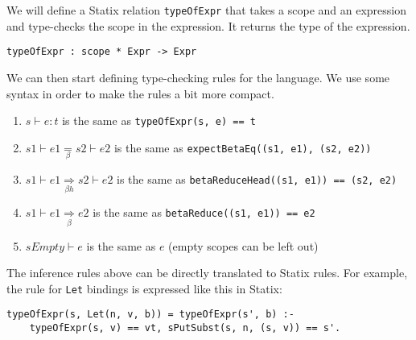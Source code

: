 \documentclass[a4paper,UKenglish,cleveref, autoref, thm-restate]{oasics-v2021}
\newcommand{\bhr}{\underset{\beta h}{\Rightarrow}}
\begin{document}
We will define a Statix relation \verb|typeOfExpr| that takes a scope and an expression and type-checks the scope in the expression. It returns the type of the expression.

\begin{lstlisting}
typeOfExpr : scope * Expr -> Expr
\end{lstlisting}
We can then start defining type-checking rules for the language. We use some syntax in order to make the rules a bit more compact. 
\begin{enumerate}
	\item $s \vdash e : t$ is the same as \verb|typeOfExpr(s, e) == t|
	\item $s1 \vdash e1 \underset{\beta}{=} s2 \vdash e2$ is the same as \verb|expectBetaEq((s1, e1), (s2, e2))|
	\item $s1 \vdash e1 \bhr s2 \vdash e2$ is the same as \verb|betaReduceHead((s1, e1)) == (s2, e2)|
	\item $s1 \vdash e1 \underset{\beta}{\Rightarrow} e2$ is the same as \verb|betaReduce((s1, e1)) == e2|
	\item $sEmpty \vdash e$ is the same as $e$ (empty scopes can be left out)
\end{enumerate}

The inference rules above can be directly translated to Statix rules. For example, the rule for \verb|Let| bindings is expressed like this in Statix:
\begin{lstlisting}
typeOfExpr(s, Let(n, v, b)) = typeOfExpr(s', b) :-
    typeOfExpr(s, v) == vt, sPutSubst(s, n, (s, v)) == s'.
\end{lstlisting}
\end{document}
